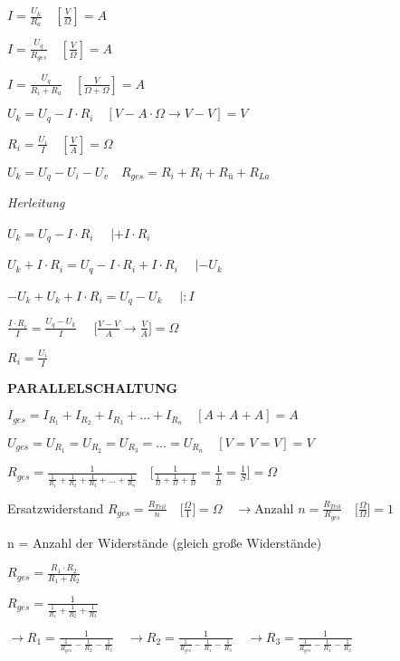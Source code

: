 $I = \frac{U_k}{R_a} \quad [\frac{V}{\Omega}] = A$

$I = \frac{U_q}{R_{ges}} \quad [\frac{V}{\Omega}] = A$

$I = \frac{U_q}{R_i + R_a} \quad [\frac{V}{\Omega + \Omega}] = A$

$\boxed{U_k = U_q - I \cdot R_i} \quad [V - A \cdot \Omega \to V - V] = V$

$\boxed{R_i = \frac{U_i}{I}} \quad [\frac{V}{A}] = \Omega$

$\boxed{U_k = U_q - U_i - U_v} \quad \boxed{R_{ges} = R_i + R_l + R_\text{ü} + R_{La}}$

\emph{Herleitung}

$U_k = U_q - I \cdot R_i$ $\quad | +I \cdot R_i$

$U_k + I \cdot R_i = U_q - I \cdot R_i + I \cdot R_i$ $\quad | -U_k$

$-U_k + U_k + I \cdot R_i = U_q - U_k$ $\quad | :I$

$\frac{I \cdot R_i}{I} = \frac{U_q - U_k}{I}$
$\quad \bigl[\frac{V - V}{A} \to \frac{V}{A}\bigl] = \Omega$

$R_i = \frac{U_i}{I}$

\textbf{PARALLELSCHALTUNG}

$\boxed{I_{ges} = I_{R_1} + I_{R_2} + I_{R_3} + \dots + I_{R_n}}\quad [A + A + A] = A$

$\boxed{U_{ges} = U_{R_1} = U_{R_2} = U_{R_3} = \dots = U_{R_n}}\quad [V = V = V] = V$

$\boxed{R_{ges} = \frac{1}{\frac{1}{R_1} + \frac{1}{R_2} + \frac{1}{R_3} + \dots + \frac{1}{R_n}}} \quad \bigl[\frac{1}{\frac{1}{\Omega} + \frac{1}{\Omega} + \frac{1}{\Omega}} = \frac{1}{\frac{1}{\Omega}} = \frac{1}{S}\bigl] = \Omega$

Ersatzwiderstand
$\boxed{R_{ges} = \frac{R_{Teil}}{n}} \quad \bigl[\frac{\Omega}{1}\bigl] = \Omega \quad \to \text{Anzahl } n = \frac{R_{Teil}}{R_{ges}} \quad \bigl[\frac{\Omega}{\Omega}\bigl] = 1$

n = Anzahl der Widerstände (gleich große Widerstände)

$\boxed{R_{ges} = \frac{R_1 \cdot R_2}{R_1 + R_2}}$

$R_{ges} = \frac{1}{\frac{1}{R_1} + \frac{1}{R_2} + \frac{1}{R_3}}$

$\to R_{1} = \frac{1}{\frac{1}{R_{ges}} - \frac{1}{R_2} - \frac{1}{R_3}} \quad \to R_{2} = \frac{1}{\frac{1}{R_{ges}} - \frac{1}{R_1} - \frac{1}{R_3}} \quad \to R_{3} = \frac{1}{\frac{1}{R_{ges}} - \frac{1}{R_1} - \frac{1}{R_2}}$

